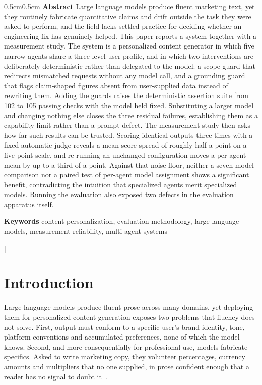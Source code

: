 \documentclass[9pt,twocolumn]{extarticle}
\begin{document}
\begin{@twocolumnfalse}
  \begin{adjustwidth}{0.5cm}{0.5cm}
  \noindent\textbf{Abstract}\quad
  Large language models produce fluent marketing text, yet they routinely
  fabricate quantitative claims and drift outside the task they were asked to
  perform, and the field lacks settled practice for deciding whether an
  engineering fix has genuinely helped. This paper reports a system together
  with a measurement study. The system is a personalized content generator in
  which five narrow agents share a three-level user profile, and in which two
  interventions are deliberately deterministic rather than delegated to the
  model: a scope guard that redirects mismatched requests without any model
  call, and a grounding guard that flags claim-shaped figures absent from
  user-supplied data instead of rewriting them. Adding the guards raises the
  deterministic assertion suite from 102 to 105 passing checks with the model
  held fixed. Substituting a larger model and changing nothing else closes the
  three residual failures, establishing them as a capability limit rather than
  a prompt defect. The measurement study then asks how far such results can be
  trusted. Scoring identical outputs three times with a fixed automatic judge
  reveals a mean score spread of roughly half a point on a five-point scale,
  and re-running an unchanged configuration moves a per-agent mean by up to a
  third of a point. Against that noise floor, neither a seven-model comparison
  nor a paired test of per-agent model assignment shows a significant benefit,
  contradicting the intuition that specialized agents merit specialized
  models. Running the evaluation also exposed two defects in the evaluation
  apparatus itself.
  \par\vspace{5pt}
  \noindent\textbf{Keywords}\quad
  content personalization, evaluation methodology, large language models,
  measurement reliability, multi-agent systems
  \end{adjustwidth}
  \vspace{12pt}
  \end{@twocolumnfalse}
]

\section{Introduction}

Large language models produce fluent prose across many domains, yet deploying
them for personalized content generation exposes two problems that fluency does
not solve. First, output must conform to a specific user's brand identity,
tone, platform conventions and accumulated preferences, none of which the model
knows. Second, and more consequentially for professional use, models fabricate
specifics. Asked to write marketing copy, they volunteer percentages, currency
amounts and multipliers that no one supplied, in prose confident enough that a
reader has no signal to doubt it~\cite{ji2023hallucination}.
\end{document}
